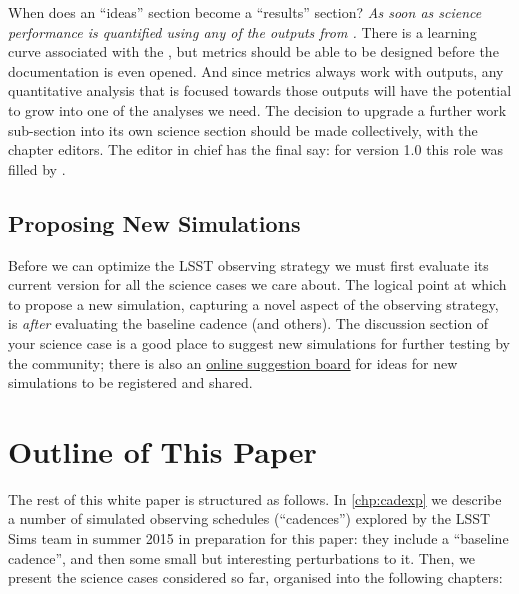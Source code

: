 When does an  ``ideas'' section become a ``results'' section? {\it As
soon as science  performance is quantified using any of the outputs from
\OpSim.} There is  a learning curve associated with the \MAF, but
metrics should be able to be designed before the \MAF documentation is
even opened. And since \MAF metrics always work with \OpSim outputs, any
quantitative analysis that is focused towards those outputs will have
the potential to grow into one of the \MAF analyses we need. The decision to upgrade a further work sub-section into its own science section should be made collectively, with the chapter editors. The editor in chief has the final say: for version 1.0 this role was filled by .


\subsection{Proposing New Simulations}

Before we can optimize the LSST observing strategy we must first
evaluate its current version for all the science cases we care about.
The logical point at which to propose a new \OpSim simulation, capturing
a novel aspect of the observing strategy, is {\it after} evaluating the
baseline  cadence (and others). The discussion section of your science
case is a good place to suggest new \OpSim simulations for further
testing by the community; there is also an
\href{https://github.com/LSSTScienceCollaborations/ObservingStrategy/blob/master/opsim/README.md}{online
suggestion board} for ideas for new  simulations to be registered and
shared.

\navigationbar


\section{Outline of This Paper}
\def\secname{intro:outline}\label{sec:\secname}

The rest of this white paper is structured as follows. In
\autoref{chp:cadexp} we describe a number of \OpSim simulated observing
schedules (``cadences'') explored by the LSST Sims team in summer 2015
in preparation for this paper: they include a ``baseline cadence'', and
then some small but interesting perturbations to it. Then, we present
the science cases considered so far, organised into the following
chapters:

